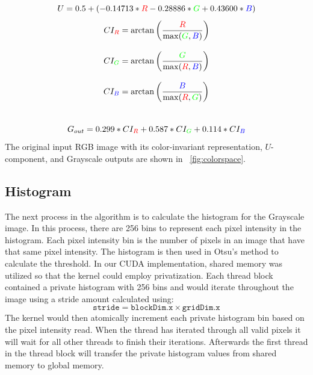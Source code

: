 \documentclass[conference]{IEEEtran}
\begin{document}
         \begin{equation}\label{eq:U}
            U = 0.5 + ( -0.14713 * \textcolor{red}{R} - 0.28886 * \textcolor{green}{G} + 0.43600 * \textcolor{blue}{B})
         \end{equation}
         \begin{subequations}\label{eq:CI}
            \begin{align}
               CI_{\textcolor{red}{R}}   & = \arctan\left(\frac{\textcolor{red}{R}}{\max(\textcolor{green}{G},\textcolor{blue}{B})}\right)\label{eq:CI_R} \\[2ex]
               CI_{\textcolor{green}{G}} & = \arctan\left(\frac{\textcolor{green}{G}}{\max(\textcolor{red}{R},\textcolor{blue}{B})}\right)\label{eq:CI_G} \\[2ex]
               CI_{\textcolor{blue}{B}}  & = \arctan\left(\frac{\textcolor{blue}{B}}{\max(\textcolor{red}{R},\textcolor{green}{G})}\right)\label{eq:CI_B}
            \end{align}
         \end{subequations}\\
         \begin{equation}\label{eq:GO}
           G_{out} = 0.299 * CI_{\textcolor{red}{R}} + 0.587 * CI_{\textcolor{green}{G}} + 0.114 * CI_{\textcolor{blue}{B}}
         \end{equation}
         The original input RGB image with its color-invariant representation, \( U \)-component, and Grayscale outputs are shown in \figurename~\ref{fig:colorspace}.
      \subsection{Histogram}
         The next process in the algorithm is to calculate the histogram for the Grayscale image. In this process, there are 256 bins to represent each pixel intensity in the histogram. Each pixel intensity bin is the number of pixels in an image that have that same pixel intensity. The histogram is then used in Otsu’s method \cite{Otsu1979} to calculate the threshold. In our CUDA implementation, shared memory was utilized so that the kernel could employ privatization. Each thread block contained a private histogram with 256 bins and would iterate throughout the image using a stride amount calculated using:
         \begin{equation}\label{eq:stride}
            \mathtt{stride} = \mathtt{blockDim.x} \times \mathtt{gridDim.x}
         \end{equation}
         The kernel would then atomically increment each private histogram bin based on the pixel intensity read. When the thread has iterated through all valid pixels it will wait for all other threads to finish their iterations. Afterwards the first thread in the thread block will transfer the private histogram values from shared memory to global memory.
\end{document}

